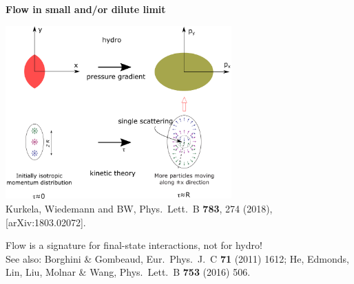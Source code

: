 \documentclass[9pt,a4paper,unknownkeysallowed,xcolor=dvipsnames,aspectratio=43]{beamer}
\begin{document}
\begin{frame}{\bf\huge Flow in small and/or dilute limit}
\vspace{4mm}
\begin{center}
\includegraphics[width=0.65\textwidth]{fig/onehit}\\
{\tiny  {\color{teablue} Kurkela, Wiedemann and BW,
  Phys.\ Lett.\ B {\bf 783}, 274 (2018), [arXiv:1803.02072].
  }
  }
\end{center}
\vspace{4mm}
{{\LARGE\color{darkred} Flow is a signature for final-state interactions, not for hydro!}}
\vspace{2mm}\\
{\tiny  See also: {\color{teablue}   Borghini \& Gombeaud,
  Eur.\ Phys.\ J.\ C {\bf 71} (2011) 1612; He, Edmonds, Lin, Liu, Molnar \& Wang,
  Phys.\ Lett.\ B {\bf 753} (2016) 506.
  }
}
\end{frame}
%
%
\end{document}
